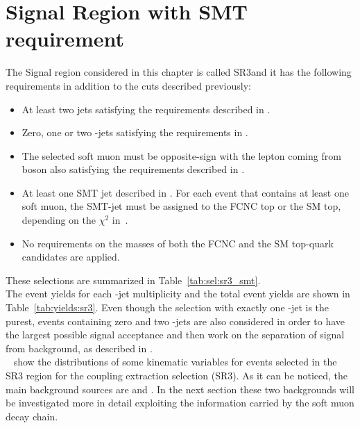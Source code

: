 \section {Signal Region with SMT requirement}
\label{sec:sel:sr3}
The Signal region considered in this chapter is called SR3\tZc and it has the following requirements in addition to the cuts described previously:
\begin{itemize}
	\item At least two jets satisfying the requirements described in . 
	\item Zero, one or two \Pqb-jets satisfying the requirements in . 
	\item The selected soft muon must be opposite-sign with the lepton coming from \PW boson also satisfying the requirements described in  .
	\item At least one SMT jet described in . For each event that contains at least one 
	soft muon, the SMT-jet must be assigned to the FCNC top or the SM top, depending on the $\chi^2$ 
	in~.	 
	\item No requirements on the masses of both the FCNC and the SM top-quark candidates are applied. 
\end{itemize}
These selections are summarized in Table~\ref{tab:sel:sr3_smt}.\\
The event yields for each \Pqb-jet multiplicity and the total event yields are shown in Table~\ref{tab:yields:sr3}. 
Even though the selection with exactly one \Pqb-jet is the purest, events containing zero and two \Pqb-jets are also considered in order to have the largest possible signal acceptance and then work on the separation of signal from background, as described in .\\
~ show the distributions of some kinematic variables for events selected in the SR3 region for the \tZc coupling extraction selection (SR3\tZc). 
As it can be noticed, the main background sources are \ttZ and \VVHF. In the next section these
two backgrounds will be investigated more in detail exploiting the information carried by the soft muon
decay chain.


